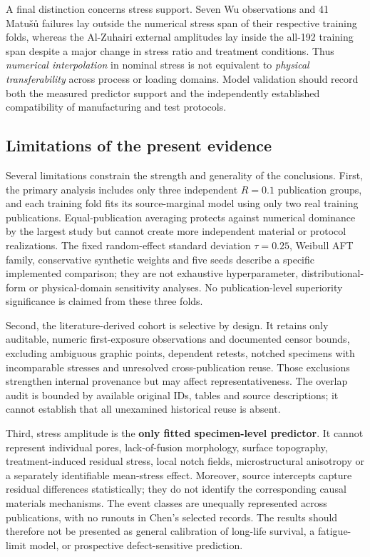 \documentclass[12pt,a4paper]{article}
\begin{document}
A final distinction concerns stress support. Seven Wu observations and 41 Matušů failures lay outside the numerical stress span of their respective training folds, whereas the Al-Zuhairi external amplitudes lay inside the all-192 training span despite a major change in stress ratio and treatment conditions. Thus \emph{numerical interpolation} in nominal stress is not equivalent to \emph{physical transferability} across process or loading domains. Model validation should record both the measured predictor support and the independently established compatibility of manufacturing and test protocols.

\subsection{Limitations of the present evidence}

Several limitations constrain the strength and generality of the conclusions. First, the primary analysis includes only three independent \(R=0.1\) publication groups, and each training fold fits its source-marginal model using only two real training publications. Equal-publication averaging protects against numerical dominance by the largest study but cannot create more independent material or protocol realizations. The fixed random-effect standard deviation \(\tau=0.25\), Weibull AFT family, conservative synthetic weights and five seeds describe a specific implemented comparison; they are not exhaustive hyperparameter, distributional-form or physical-domain sensitivity analyses. No publication-level superiority significance is claimed from these three folds.

Second, the literature-derived cohort is selective by design. It retains only auditable, numeric first-exposure observations and documented censor bounds, excluding ambiguous graphic points, dependent retests, notched specimens with incomparable stresses and unresolved cross-publication reuse. Those exclusions strengthen internal provenance but may affect representativeness. The overlap audit is bounded by available original IDs, tables and source descriptions; it cannot establish that all unexamined historical reuse is absent.

Third, stress amplitude is the \textbf{only fitted specimen-level predictor}. It cannot represent individual pores, lack-of-fusion morphology, surface topography, treatment-induced residual stress, local notch fields, microstructural anisotropy or a separately identifiable mean-stress effect. Moreover, source intercepts capture residual differences statistically; they do not identify the corresponding causal materials mechanisms. The event classes are unequally represented across publications, with no runouts in Chen's selected records. The results should therefore not be presented as general calibration of long-life survival, a fatigue-limit model, or prospective defect-sensitive prediction.
\end{document}
